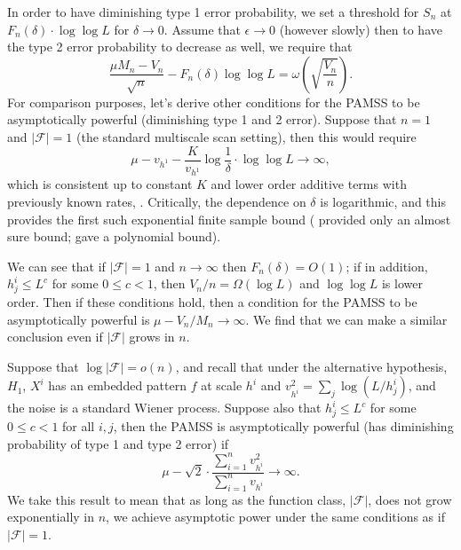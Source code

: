 In order to have diminishing type 1 error probability, we set a threshold for $S_n$ at $F_n(\delta) \cdot \log \log L$ for $\delta \rightarrow 0$.
Assume that $\epsilon \rightarrow 0$ (however slowly) then to have the type 2 error probability to decrease as well, we require that
\[
\frac{\mu M_n - V_n}{\sqrt n} - F_n(\delta) \log \log L = \omega\left( \sqrt{\frac{V_n}{n}} \right).
\]
For comparison purposes, let's derive other conditions for the PAMSS to be asymptotically powerful (diminishing type 1 and 2 error).
Suppose that $n = 1$ and $|\mathcal F| = 1$ (the standard multiscale scan setting), then this would require
\[
\mu - v_{h^1} - \frac{K}{v_{h^1}} \log \frac 1 \delta \cdot \log \log L \rightarrow \infty,
\]
which is consistent up to constant $K$ and lower order additive terms with previously known rates, \cite{proksch2016multiscale}.
Critically, the dependence on $\delta$ is logarithmic, and this provides the first such exponential finite sample bound (\cite{dumbgen2001multiscale} provided only an almost sure bound; \cite{proksch2016multiscale} gave a polynomial bound).

We can see that if $|\mathcal F| = 1$ and $n \rightarrow \infty$ then $F_n(\delta) = O(1)$; if in addition, $h_j^i \le L^c$ for some $0 \le c < 1$, then $V_n / n = \Omega(\log L)$ and $\log \log L$ is lower order.
Then if these conditions hold, then a condition for the PAMSS to be asymptotically powerful is
$
\mu - V_n/M_n\rightarrow \infty.
$
We find that we can make a similar conclusion even if $|\mathcal F|$ grows in $n$.

\begin{corollary}
Suppose that $\log |\mathcal F| = o(n)$, and recall that under the alternative hypothesis, $H_1$, $X^i$ has an embedded pattern $f$ at scale $h^i$ and $v_{h^i}^2 = \sum_j \log(L/h_j^i)$, and the noise is a standard Wiener process.
Suppose also that $h^i_j \le L^{c}$ for some $0 \le c < 1$ for all $i,j$, then the PAMSS is asymptotically powerful (has diminishing probability of type 1 and type 2 error) if
\begin{equation}
\mu - \sqrt 2 \cdot \frac{\sum_{i=1}^n v_{h^i}^2}{\sum_{i=1}^n v_{h^i}} \rightarrow \infty.
\end{equation}
We take this result to mean that as long as the function class, $|\mathcal F|$, does not grow exponentially in $n$, we achieve asymptotic power under the same conditions as if $|\mathcal F| = 1$.
\end{corollary}

